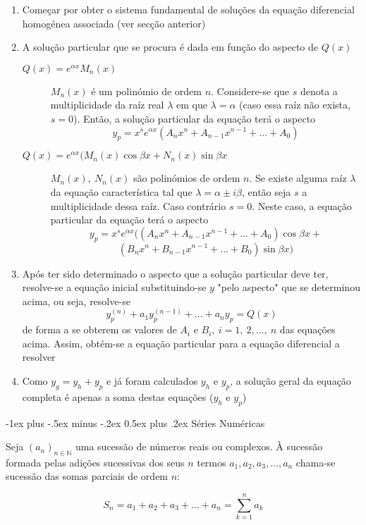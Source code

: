 \documentclass[10pt,landscape]{article}
\makeatletter
\renewcommand{\section}{\@startsection{section}{1}{0mm}%
                                {-1ex plus -.5ex minus -.2ex}%
                                {0.5ex plus .2ex}%
                                {\normalfont\large\bfseries}}
\makeatother
\begin{document}
\begin{multicols}{3}
\begin{enumerate}
\item Começar por obter o sistema fundamental de soluções da equação diferencial homogénea associada (ver secção anterior)
\item A solução particular que se procura é dada em função do aspecto de $Q(x)$
\begin{description}
\item[$Q(x) = e^{\alpha x} M_n(x)$] $M_n(x)$ é um polinómio de ordem $n$. Considere-se que $s$ denota a multiplicidade da raíz real $\lambda$ em que $\lambda = \alpha$ (caso essa raíz não exista, $s = 0$). Então, a solução particular da equação terá o aspecto
$$y_p = x^s e^{\alpha x} (A_nx^n + A_{n-1}x^{n-1} + ... + A_0)$$
\item[$Q(x) = e^{\alpha x}(M_n(x)\cos{\beta x} + N_n(x)\sin{\beta x}$] $M_n(x),\ N_n(x)$ são polinómios de ordem $n$. Se existe alguma raíz $\lambda$ da equação característica tal que $\lambda = \alpha \pm i\beta$, então seja $s$ a multiplicidade dessa raíz. Caso contrário $s = 0$. Neste caso, a equação particular da equação terá o aspecto
$$y_p = x^s e^{\alpha x}((A_nx^n + A_{n-1}x^{n-1} + ... + A_0)\cos{\beta x} +$$
$$(B_nx^n + B_{n-1}x^{n-1} + ... + B_0)\sin{\beta x})$$
\end{description}
\item Após ter sido determinado o aspecto que a solução particular deve ter, resolve-se a equação inicial substituindo-se $y$ "pelo aspecto" que se determinou acima, ou seja, resolve-se
$$y_p^{(n)} + a_1 y_p^{(n-1)} + ... + a_n y_p = Q(x)$$
de forma a se obterem os valores de $A_i$ e $B_i,\ i = 1,\ 2, ...,\ n$ das equações acima. Assim, obtém-se a equação particular para a equação diferencial a resolver
\item Como $y_g = y_h + y_p$ e já foram calculados $y_h$ e $y_p$, a solução geral da equação completa é apenas a soma destas equações ($y_h$ e $y_p$)
\end{enumerate}

\section{Séries Numéricas}

Seja $(a_n)_{n \in \mathbb{N}}$ uma sucessão de números reais ou complexos. À sucessão formada pelas adições sucessivas dos seus $n$ termos $a_1, a_2, a_3, ..., a_n$ chama-se sucessão das somas parciais de ordem $n$:

$$S_n = a_1 + a_2 + a_3 + ... + a_n = \sum\limits_{k=1}^n a_k$$


\end{multicols}
\end{document}

